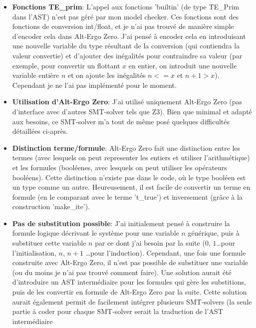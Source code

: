 \documentclass[a4paper]{article}%
\begin{document}
	\begin{itemize}
		\item \textbf{Fonctions TE\_prim}: L'appel aux fonctions 'builtin' (de type TE\_Prim dans l'AST) n'est pas géré par mon model checker.
		Ces fonctions sont des fonctions de conversion int/float, et je n'ai pas trouvé de manière simple d'encoder cela dans Alt-Ergo Zero.
		J'ai pensé à encoder cela en introduisant une nouvelle variable du type résultant de la conversion (qui contiendra la valeur convertie)
		et d'ajouter des inégalités pour contraindre sa valeur (par exemple, pour convertir un flottant $x$ en entier, on introduit une nouvelle
		variable entière $n$ et on ajoute les inégalités $n <= x$ et $n+1 > x$). Cependant je ne l'ai pas implémenté pour le moment.\\
		\item \textbf{Utilisation d'Alt-Ergo Zero}: J'ai utilisé uniquement Alt-Ergo Zero (pas d'interface avec d'autres SMT-solver tels que Z3).
		Bien que minimal et adapté aux besoins, ce SMT-solver m'a tout de même posé quelques difficultés détaillées ci-après.\\
		\item \textbf{Distinction terme/formule}: Alt-Ergo Zero fait une distinction entre les termes (avec lesquels on peut representer les entiers
		et utiliser l'arithmétique) et les formules (booléenes, avec lesquels on peut utiliser les opérateurs booléens).
		Cette distinction n'existe pas dans le code, où le type booléen est un type comme un autre.
		Heureusement, il est facile de convertir un terme en formule (en le comparant avec le terme 't\_true') et inversement (grâce à la construction 'make\_ite').\\
		\item \textbf{Pas de substitution possible}: J'ai initialement pensé à construire la formule logique décrivant le système pour une variable $n$ générique,
		puis à substituer cette variable $n$ par ce dont j'ai besoin par la suite ($0$, $1$\dots pour l'initialisation, $n$, $n+1$ \ldots pour l'induction).
		Cependant, une fois une formule construite avec Alt-Ergo Zero, il n'est pas possible de substituer une variable (ou du moins je n'ai pas trouvé comment faire).
		Une solution aurait été d'introduire un AST intermédiaire pour les formules qui gère les substitions, puis de les convertir en formule de Alt-Ergo Zero par la suite.
		Cette solution aurait également permit de facilement intégrer plusieurs SMT-solvers (la seule partie à coder pour chaque SMT-solver serait la traduction de l'AST intermédiaire

\end{itemize}
\end{document}
